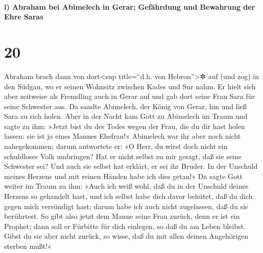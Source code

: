 \hypertarget{l-abraham-bei-abimelech-in-gerar-gefuxe4hrdung-und-bewahrung-der-ehre-saras}{%
\paragraph{l) Abraham bei Abimelech in Gerar; Gefährdung und Bewahrung
der Ehre
Saras}\label{l-abraham-bei-abimelech-in-gerar-gefuxe4hrdung-und-bewahrung-der-ehre-saras}}

\hypertarget{section-19}{%
\section{20}\label{section-19}}

 Abraham brach dann von dort\textless sup title=``d.h. von
Hebron''\textgreater✲ auf (und zog) in den Südgau, wo er seinen Wohnsitz
zwischen Kades und Sur nahm. Er hielt sich aber zeitweise als Fremdling
auch in Gerar auf  und gab dort seine Frau Sara für seine
Schwester aus. Da sandte Abimelech, der König von Gerar, hin und ließ
Sara zu sich holen.  Aber in der Nacht kam Gott zu
Abimelech im Traum und sagte zu ihm: »Jetzt bist du des Todes wegen der
Frau, die du dir hast holen lassen: sie ist ja eines Mannes Ehefrau!«
 Abimelech war ihr aber noch nicht nahegekommen; darum
antwortete er: »O Herr, du wirst doch nicht ein schuldloses Volk
umbringen?  Hat er nicht selbst zu mir gesagt, daß sie
seine Schwester sei? Und auch sie selbst hat erklärt, er sei ihr Bruder.
In der Unschuld meines Herzens und mit reinen Händen habe ich dies
getan!«  Da sagte Gott weiter im Traum zu ihm: »Auch ich
weiß wohl, daß du in der Unschuld deines Herzens so gehandelt hast, und
ich selbst habe dich davor behütet, daß du dich gegen mich versündigt
hast; darum habe ich auch nicht zugelassen, daß du sie berührtest.
 So gibt also jetzt dem Manne seine Frau zurück, denn er
ist ein Prophet; dann soll er Fürbitte für dich einlegen, so daß du am
Leben bleibst. Gibst du sie aber nicht zurück, so wisse, daß du mit
allen deinen Angehörigen sterben mußt!«

